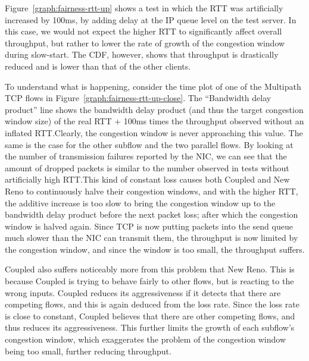 Figure~\ref{graph:fairness-rtt-up} shows a test in which the RTT was
artificially increased by 100ms, by adding delay at the IP queue level on the
test server. In this case, we would not expect the higher RTT to significantly
affect overall throughput, but rather to lower the rate of growth of the
congestion window during slow-start. The CDF, however, shows that throughput is
drastically reduced and is lower than that of the other clients.

To understand what is happening, consider the time plot of one of the Multipath
TCP flows in Figure~\ref{graph:fairness-rtt-up-close}. The ``Bandwidth delay
product'' line shows the bandwidth delay product (and thus the target congestion
window size) of the real RTT + 100ms times the throughput observed without an
inflated RTT.\@ Clearly, the congestion window is never approaching this value.
The same is the case for the other subflow and the two parallel flows. By
looking at the number of transmission failures reported by the NIC, we can see
that the amount of dropped packets is similar to the number observed in tests
without artificially high RTT.\@ This kind of constant loss causes both Coupled
and New Reno to continuously halve their congestion windows, and with the higher
RTT, the additive increase is too slow to bring the congestion window up to the
bandwidth delay product before the next packet loss; after which the congestion 
window is halved again. Since TCP is now putting packets into the send queue 
much slower than the NIC can transmit them, the throughput is now limited by the 
congestion window, and since the window is too small, the throughput suffers.

Coupled also suffers noticeably more from this problem that New Reno. This is
because Coupled is trying to behave fairly to other flows, but is reacting to
the wrong inputs.  Coupled reduces its aggressiveness if it detects that there
are competing flows, and this is again deduced from the loss rate. Since the
loss rate is close to constant, Coupled believes that there are other competing
flows, and thus reduces its aggressiveness. This further limits the growth of
each subflow's congestion window, which exaggerates the problem of the
congestion window being too small, further reducing throughput.

